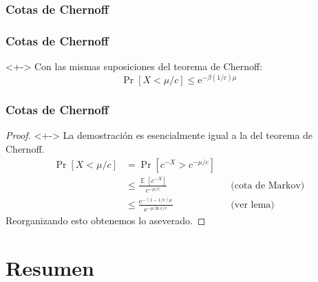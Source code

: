 \documentclass[english, spanish, fleqn,%
hyperref = {colorlinks, urlcolor = blue}%
]{beamer}
\DeclareMathOperator{\Exp}{\mathbb{E}}
\begin{document}
\begin{frame}
  \setcounter{beamerpauses}{2}
  \frametitle{Cotas de Chernoff}

\end{frame}

\begin{frame}
  \setcounter{beamerpauses}{2}
  \frametitle{Cotas de Chernoff}

  \begin{theorem}<+->
    Con las mismas suposiciones del teorema de Chernoff:
    \begin{equation}
      \label{eq:Chernoff-lower-tail}
      \Pr[X < \mu / c]
        \le \mathrm{e}^{- \beta(1 / c) \mu}
    \end{equation}
  \end{theorem}
\end{frame}

\begin{frame}
  \setcounter{beamerpauses}{2}
  \frametitle{Cotas de Chernoff}

  \begin{proof}<+->
    La demostración es esencialmente igual
    a la del teorema de Chernoff.
    \begin{align*}
      \Pr[X < \mu / c]
        &=   \Pr\left[ c^{-X} > c^{- \mu / c} \right] \\
        &\le \frac{\Exp[c^{- X}]}{c^{- \mu / c}}
                && \text{(cota de Markov)} \\
        &\le \frac{\mathrm{e}^{-(1 - 1/c) \mu}}{\mathrm{e}^{- \mu \ln c / c}}
                && \text{(ver lema)}
    \end{align*}
    Reorganizando esto obtenemos lo aseverado.
  \end{proof}
\end{frame}

\section{Resumen}
\end{document}
